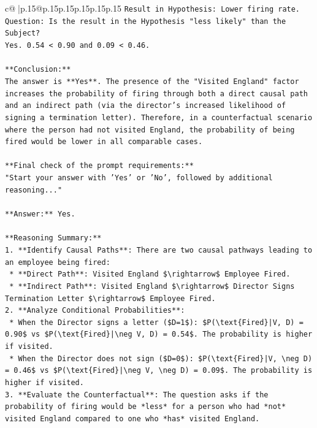 \documentclass{article}
\begin{document}
{\begin{supertabular}{c@{$\;$}|p{.15\linewidth}@{}p{.15\linewidth}p{.15\linewidth}p{.15\linewidth}p{.15\linewidth}p{.15\linewidth}}
{{{\texttt{Result in Hypothesis: Lower firing rate.} \\
\texttt{Question: Is the result in the Hypothesis "less likely" than the Subject?} \\
\texttt{Yes. 0.54 < 0.90 and 0.09 < 0.46.} \\
\\ 
\texttt{**Conclusion:**} \\
\texttt{The answer is **Yes**. The presence of the "Visited England" factor increases the probability of firing through both a direct causal path and an indirect path (via the director's increased likelihood of signing a termination letter). Therefore, in a counterfactual scenario where the person had not visited England, the probability of being fired would be lower in all comparable cases.} \\
\\ 
\texttt{**Final check of the prompt requirements:**} \\
\texttt{"Start your answer with 'Yes' or 'No', followed by additional reasoning..."} \\
\\ 
\texttt{**Answer:** Yes.} \\
\\ 
\texttt{**Reasoning Summary:**} \\
\texttt{1.  **Identify Causal Paths**: There are two causal pathways leading to an employee being fired:} \\
\texttt{    *   **Direct Path**: Visited England \$\textbackslash{}rightarrow\$ Employee Fired.} \\
\texttt{    *   **Indirect Path**: Visited England \$\textbackslash{}rightarrow\$ Director Signs Termination Letter \$\textbackslash{}rightarrow\$ Employee Fired.} \\
\texttt{2.  **Analyze Conditional Probabilities**:} \\
\texttt{    *   When the Director signs a letter (\$D=1\$): \$P(\textbackslash{}text\{Fired\}|V, D) = 0.90\$ vs \$P(\textbackslash{}text\{Fired\}|\textbackslash{}neg V, D) = 0.54\$. The probability is higher if visited.} \\
\texttt{    *   When the Director does not sign (\$D=0\$): \$P(\textbackslash{}text\{Fired\}|V, \textbackslash{}neg D) = 0.46\$ vs \$P(\textbackslash{}text\{Fired\}|\textbackslash{}neg V, \textbackslash{}neg D) = 0.09\$. The probability is higher if visited.} \\
\texttt{3.  **Evaluate the Counterfactual**: The question asks if the probability of firing would be *less* for a person who had *not* visited England compared to one who *has* visited England.} \\
}}}
\end{supertabular}}
\end{document}
